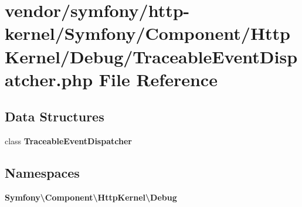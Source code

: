 \section{vendor/symfony/http-\/kernel/\+Symfony/\+Component/\+Http\+Kernel/\+Debug/\+Traceable\+Event\+Dispatcher.php File Reference}
\label{http-kernel_2_symfony_2_component_2_http_kernel_2_debug_2_traceable_event_dispatcher_8php}
\subsection*{Data Structures}
\begin{DoxyCompactItemize}
\item 
class {\bf Traceable\+Event\+Dispatcher}
\end{DoxyCompactItemize}
\subsection*{Namespaces}
\begin{DoxyCompactItemize}
\item 
 {\bf Symfony\textbackslash{}\+Component\textbackslash{}\+Http\+Kernel\textbackslash{}\+Debug}
\end{DoxyCompactItemize}
